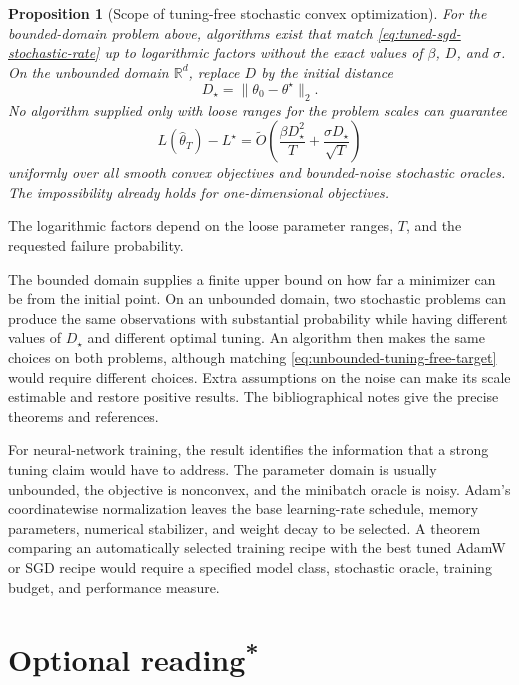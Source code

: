 \documentclass[11pt,twoside]{article}
\newcommand{\R}{\mathbb R}
\newcommand{\suppmark}{\texorpdfstring{\textsuperscript{*}}{*}}
\newtheorem{proposition}[theorem]{Proposition}
\theoremstyle{definition}
\theoremstyle{remark}
\begin{document}
\begin{proposition}[Scope of tuning-free stochastic convex optimization]
\label{prop:tuning-free-scope}
For the bounded-domain problem above, algorithms exist that match
\cref{eq:tuned-sgd-stochastic-rate} up to logarithmic factors without the exact
values of $\beta$, $D$, and $\sigma$. On the unbounded domain $\R^d$, replace
$D$ by the initial distance
\begin{equation}
 D_\star=\|\theta_0-\theta^\star\|_2.
 \label{eq:initial-distance-tuning}
\end{equation}
No algorithm supplied only with loose ranges for the problem scales can
guarantee
\begin{equation}
 L(\widehat\theta_T)-L^\star
 =\widetilde O\left(
    \frac{\beta D_\star^2}{T}
    +\frac{\sigma D_\star}{\sqrt T}
  \right)
 \label{eq:unbounded-tuning-free-target}
\end{equation}
uniformly over all smooth convex objectives and bounded-noise stochastic
oracles. The impossibility already holds for one-dimensional objectives.
\end{proposition}

The logarithmic factors depend on the loose parameter ranges, $T$, and the
requested failure probability.

The bounded domain supplies a finite upper bound on how far a minimizer can be
from the initial point. On an unbounded domain, two stochastic
problems can produce the same observations with substantial probability while
having different values of $D_\star$ and different optimal tuning. An
algorithm then makes the same choices on both problems, although matching
\cref{eq:unbounded-tuning-free-target} would require different choices. Extra
assumptions on the noise can make its scale estimable and restore positive
results. The bibliographical notes give the precise theorems and references.

For neural-network training, the result identifies the information that a
strong tuning claim would have to address. The parameter domain is usually
unbounded, the objective is nonconvex, and the minibatch oracle is noisy.
Adam's coordinatewise normalization leaves the base learning-rate schedule,
memory parameters, numerical stabilizer, and weight decay to be selected.
A theorem comparing an automatically selected training recipe with the best
tuned AdamW or SGD recipe would require a specified model class, stochastic
oracle, training budget, and performance measure.

\section{Optional reading\suppmark}
\label{sec:optional}
\end{document}
